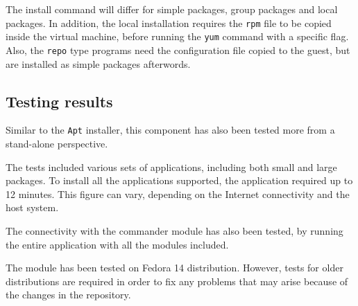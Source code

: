 The install command will differ for simple packages, group packages and local 
packages. In addition, the local installation requires the \texttt{rpm} file to 
be copied inside the virtual machine, before running the \texttt{yum} 
command with a specific flag. Also, the \texttt{repo} type programs 
need the configuration file copied to the guest, but are installed as simple 
packages afterwords.

\subsection *{Testing results}
Similar to the \texttt{Apt} installer, this component has also been tested more 
from a stand-alone perspective.

The tests included various sets of applications, including both small and large 
packages. To install all the applications supported, the application required 
up to 12 minutes. This figure can vary, depending on the Internet 
connectivity and the host system.

The connectivity with the commander module has also been tested, by running 
the entire application with all the modules included.

The module has been tested on Fedora 14 distribution. However, tests for older 
distributions are required in order to fix any problems that may arise because 
of the changes in the repository.